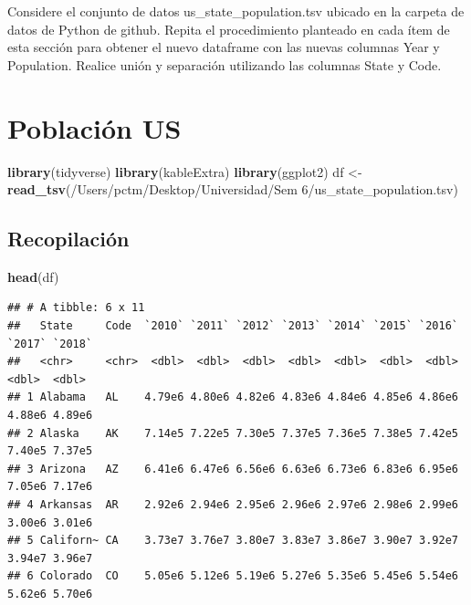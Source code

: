 \documentclass[
]{book}
\newenvironment{Shaded}{\begin{snugshade}}{\end{snugshade}}
\newcommand{\FunctionTok}[1]{\textcolor[rgb]{0.13,0.29,0.53}{\textbf{#1}}}
\newcommand{\NormalTok}[1]{#1}
\newcommand{\OtherTok}[1]{\textcolor[rgb]{0.56,0.35,0.01}{#1}}
\newcommand{\StringTok}[1]{\textcolor[rgb]{0.31,0.60,0.02}{#1}}
\begin{document}
Considere el conjunto de datos us\_state\_population.tsv ubicado en la carpeta de datos de Python de github. Repita el procedimiento planteado en cada ítem de esta sección para obtener el nuevo dataframe con las nuevas columnas Year y Population. Realice unión y separación utilizando las columnas State y Code.

\section*{Población US}\label{poblaciuxf3n-us}

\begin{Shaded}
\begin{Highlighting}[]
\FunctionTok{library}\NormalTok{(tidyverse)}
\FunctionTok{library}\NormalTok{(kableExtra)}
\FunctionTok{library}\NormalTok{(ggplot2)}
\NormalTok{df }\OtherTok{\textless{}{-}} \FunctionTok{read\_tsv}\NormalTok{(}\StringTok{\textquotesingle{}/Users/pctm/Desktop/Universidad/Sem 6/us\_state\_population.tsv\textquotesingle{}}\NormalTok{)}
\end{Highlighting}
\end{Shaded}

\subsection*{Recopilación}\label{recopilaciuxf3n}

\begin{Shaded}
\begin{Highlighting}[]
\FunctionTok{head}\NormalTok{(df)}
\end{Highlighting}
\end{Shaded}

\begin{verbatim}
## # A tibble: 6 x 11
##   State     Code  `2010` `2011` `2012` `2013` `2014` `2015` `2016` `2017` `2018`
##   <chr>     <chr>  <dbl>  <dbl>  <dbl>  <dbl>  <dbl>  <dbl>  <dbl>  <dbl>  <dbl>
## 1 Alabama   AL    4.79e6 4.80e6 4.82e6 4.83e6 4.84e6 4.85e6 4.86e6 4.88e6 4.89e6
## 2 Alaska    AK    7.14e5 7.22e5 7.30e5 7.37e5 7.36e5 7.38e5 7.42e5 7.40e5 7.37e5
## 3 Arizona   AZ    6.41e6 6.47e6 6.56e6 6.63e6 6.73e6 6.83e6 6.95e6 7.05e6 7.17e6
## 4 Arkansas  AR    2.92e6 2.94e6 2.95e6 2.96e6 2.97e6 2.98e6 2.99e6 3.00e6 3.01e6
## 5 Californ~ CA    3.73e7 3.76e7 3.80e7 3.83e7 3.86e7 3.90e7 3.92e7 3.94e7 3.96e7
## 6 Colorado  CO    5.05e6 5.12e6 5.19e6 5.27e6 5.35e6 5.45e6 5.54e6 5.62e6 5.70e6
\end{verbatim}
\end{document}

